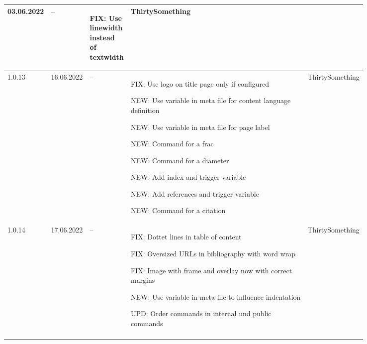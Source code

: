 \begin{tiny}
\begin{longtable}{ | p{0.06\linewidth} | p{0.08\linewidth} | p{0.06\linewidth} | P{0.49\linewidth} | p{0.15\linewidth} | }
        03.06.2022               &
        --                       &
        \begin{tsLTItemize}
            \item FIX: Use linewidth instead of textwidth
        \end{tsLTItemize}
                                 &
        ThirtySomething            \\
        \hline
        1.0.13                   &
        16.06.2022               &
        --                       &
        \begin{tsLTItemize}
            \item FIX: Use logo on title page only if configured
            \item NEW: Use variable in meta file for content language definition
            \item NEW: Use variable in meta file for page label
            \item NEW: Command for a frac
            \item NEW: Command for a diameter
            \item NEW: Add index and trigger variable
            \item NEW: Add references and trigger variable
            \item NEW: Command for a citation
        \end{tsLTItemize}
                                 &
        ThirtySomething            \\
        \hline
        1.0.14                   &
        17.06.2022               &
        --                       &
        \begin{tsLTItemize}
            \item FIX: Dottet lines in table of content
            \item FIX: Oversized URLs in bibliography with word wrap
            \item FIX: Image with frame and overlay now with correct margins
            \item NEW: Use variable in meta file to influence indentation
            \item UPD: Order commands in internal und public commands
        \end{tsLTItemize}
                                 &
        ThirtySomething            \\
        \hline
    \end{longtable}
\end{tiny}

